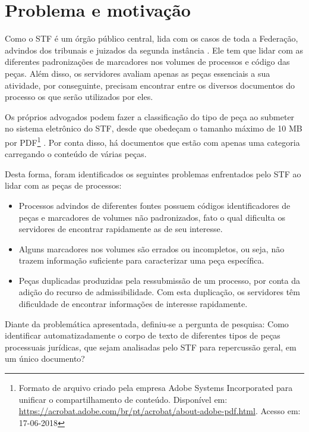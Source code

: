 \section{Problema e motivação}\label{sec:problema}

Como o STF é um órgão público central, lida com os casos de toda a Federação, advindos dos tribunais e juizados da segunda instância \cite{BRASIL1988}. Ele tem que lidar com as diferentes padronizações de marcadores nos volumes de processos e código das peças. Além disso, os servidores avaliam apenas as peças essenciais a sua atividade, por conseguinte, precisam encontrar entre os diversos documentos do processo os que serão utilizados por eles.

Os próprios advogados podem fazer a classificação do tipo de peça ao submeter no sistema eletrônico do STF, desde que obedeçam o tamanho máximo de 10 MB por PDF\footnote{Formato de arquivo criado pela empresa Adobe Systems Incorporated para unificar o compartilhamento de conteúdo. Disponível em: \url{https://acrobat.adobe.com/br/pt/acrobat/about-adobe-pdf.html}. Acesso em: 17-06-2018} \cite{STF2010}. Por conta disso, há documentos que estão com apenas uma categoria carregando o conteúdo de várias peças.
%

Desta forma, foram identificados os seguintes problemas enfrentados pelo STF ao lidar com as peças de processos:

\begin{itemize}
	\item Processos advindos de diferentes fontes possuem códigos identificadores de peças e marcadores de volumes não padronizados, fato o qual dificulta os servidores de encontrar rapidamente as de seu interesse.
    \item Alguns marcadores nos volumes são errados ou incompletos, ou seja, não trazem informação suficiente para caracterizar uma peça específica.
    \item Peças duplicadas produzidas pela ressubmissão de um processo, por conta da adição do recurso de admissibilidade. Com esta duplicação, os servidores têm dificuldade de encontrar informações de interesse rapidamente.
\end{itemize}

Diante da problemática apresentada, definiu-se a pergunta de pesquisa: Como identificar automatizadamente o corpo de texto de diferentes tipos de peças processuais jurídicas, que sejam analisadas pelo STF para repercussão geral, em um único documento?

